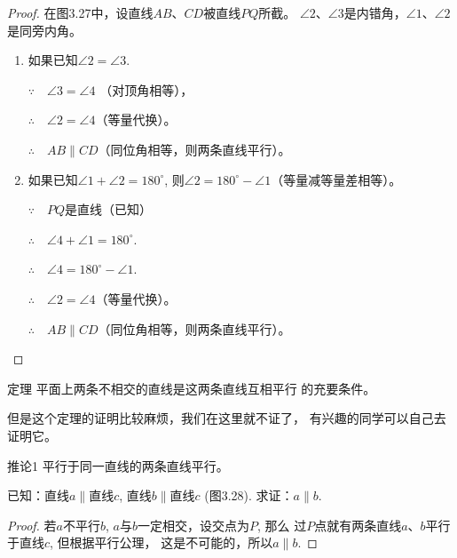 \begin{proof}
   在图3.27中，设直线$AB$、$CD$被直线$PQ$所截。
$\angle 2$、$\angle 3$是内错角，$\angle 1$、$\angle 2$是同旁内角。
\begin{enumerate}
    \item 如果已知$\angle 2=\angle 3$. 

$\because\quad \angle 3=\angle 4$    （对顶角相等），

$\therefore\quad \angle 2=\angle 4$（等量代换）。

$\therefore\quad AB\parallel CD$（同位角相等，则两条直线平行）。

\item 如果已知$\angle 1+\angle 2=180^{\circ}$, 
则$\angle 2=180^{\circ}-\angle 1$（等量减等量差相等）。

$\because\quad PQ$是直线（已知）

$\therefore\quad \angle 4+\angle 1=180^{\circ}$.

$\therefore\quad \angle 4=180^{\circ}-\angle 1$.

$\therefore\quad \angle 2=\angle 4$（等量代换）。

$\therefore\quad AB\parallel CD$（同位角相等，则两条直线平行）。  
\end{enumerate}
\end{proof}

\begin{blk}{定理} 
    平面上两条不相交的直线是这两条直线互相平行
的充要条件。
\end{blk}


但是这个定理的证明比较麻烦，我们在这里就不证了，
有兴趣的同学可以自己去证明它。

\begin{blk}
   {推论1} 平行于同一直线的两条直线平行。 
\end{blk}

已知：直线$a\parallel$直线$c$, 直线$b\parallel$直线$c$ (图3.28).
 求证：$a\parallel b$.

\begin{proof}
    若$a$不平行$b$, $a$与$b$一定相交，设交点为$P$, 那么
过$P$点就有两条直线$a$、$b$平行于直线$c$, 但根据平行公理，
这是不可能的，所以$a\parallel b$.
\end{proof}

\begin{figure}[htp]
    \centering
{}
    \caption{}
\end{figure}


